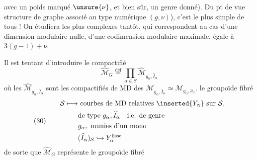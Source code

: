 avec un poids marqué $\unsure{\nu}$, et bien sûr, un genre donné). Du pt de vue structure de graphe associé au type numérique $(g,\nu)$), c'est le plus simple de tous ! On étudiera les plus complexes tantôt, qui correspondent au cas d'une dimension modulaire nulle,  d'une codimension modulaire maximale, égale à $3(g-1)+\nu$.

Il est tentant d'introduire le compactifié
\[
\widehat{\mathcal M}_G\overset{\mathrm{déf}}{=}\prod_{\alpha\in S}\widehat{\mathcal M}_{g_\alpha,\widehat I_\alpha}
\]
où les $\widehat{\mathcal M}_{g_\alpha,\widehat I_\alpha}$ sont les compactifiés de MD des $\mathcal M_{g_\alpha,\widehat I_\alpha}\simeq\mathcal M_{g_\alpha,\widehat\nu_\alpha}$.   le groupoïde fibré
\[
(30)\qquad\begin{aligned}
\mathcal S\longmapsto&\ \text{courbes de MD relatives }\inserted{Y_\alpha}\text{ sur }\mathcal S,\\
&\text{de type }g_\alpha,\widehat I_\alpha\quad\text{i.e. de genre}\\
&g_\alpha,\text{ munies d'un mono}\\
&(\widehat I_\alpha)_{\mathcal S}\hookrightarrow Y_\alpha^{\text{lisse}}
\end{aligned}
\]
de sorte que $\widehat{\mathcal M}_G$ représente le groupoïde fibré

